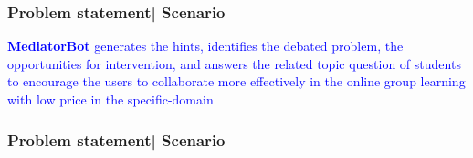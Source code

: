 \documentclass{beamer}
\begin{document}
\begin{frame}
\frametitle{Problem statement| Scenario}
\begin{center}
	
\end{center}
\textcolor{blue}{\textbf{MediatorBot} generates the hints, identifies the debated problem, the opportunities for intervention, and answers the related topic question of students to encourage the users to collaborate more effectively in the online group learning with low price in the specific-domain}
\end{frame}
\begin{frame}


\frametitle{Problem statement| Scenario}


	   \begin{columns}[t]


\end{columns}
\end{frame}
\end{document}
